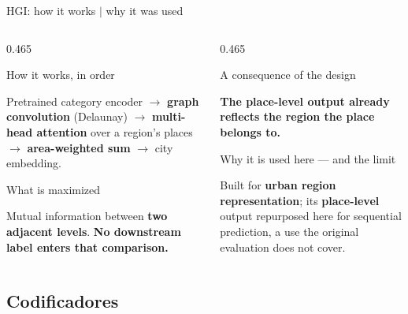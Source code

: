 \documentclass{beamer}
\begin{document}
\begin{frame}{HGI: how it works $\mid$ why it was used}
    \begin{columns}[t,onlytextwidth]
        \begin{column}{0.465\textwidth}
            \begin{block}{How it works, in order}
                {\small Pretrained category encoder $\rightarrow$ \textbf{graph convolution}
                (Delaunay) $\rightarrow$ \textbf{multi-head attention} over a region's places
                $\rightarrow$ \textbf{area-weighted sum} $\rightarrow$ city embedding.\par}
            \end{block}
            \begin{block}{What is maximized}
                {\small Mutual information between \textbf{two adjacent levels}.
                \textbf{No downstream label enters that comparison.}\par}
            \end{block}
        \end{column}
        \hfill
        \begin{column}{0.465\textwidth}
            \begin{alertblock}{A consequence of the design}
                {\small \textbf{The place-level output already reflects the region the place
                belongs to.}\par}
            \end{alertblock}
            \begin{block}{Why it is used here --- and the limit}
                {\small Built for \textbf{urban region representation}; its \textbf{place-level}
                output repurposed here for sequential prediction,
                \alert{a use the original evaluation does not cover}.\par}
            \end{block}
        \end{column}
    \end{columns}
\end{frame}

\subsection{Codificadores}
\end{document}
